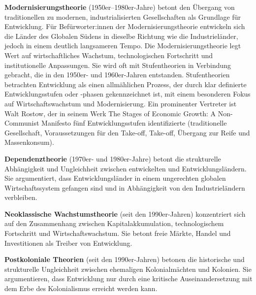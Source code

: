 \documentclass[
  letterpaper,
  DIV=11,
  numbers=noendperiod]{scrartcl}
\begin{document}
\begin{tcolorbox}[enhanced jigsaw, opacitybacktitle=0.6, breakable, left=2mm, colback=white, leftrule=.75mm, colbacktitle=quarto-callout-note-color!10!white, bottomrule=.15mm, toprule=.15mm, titlerule=0mm, title=\textcolor{quarto-callout-note-color}{\faInfo}\hspace{0.5em}{Entwicklungstheorien}, colframe=quarto-callout-note-color-frame, bottomtitle=1mm, opacityback=0, arc=.35mm, toptitle=1mm, rightrule=.15mm, coltitle=black]

\textbf{Modernisierungstheorie} (1950er--1980er-Jahre) betont den
Übergang von traditionellen zu modernen, industrialisierten
Gesellschaften als Grundlage für Entwicklung. Für Befürworter:innen der
Modernisierungstheorie entwickeln sich die Länder des Globalen Südens in
dieselbe Richtung wie die Industrieländer, jedoch in einem deutlich
langsameren Tempo. Die Modernisierungstheorie legt Wert auf
wirtschaftliches Wachstum, technologischen Fortschritt und
institutionelle Anpassungen. Sie wird oft mit Stufentheorien in
Verbindung gebracht, die in den 1950er- und 1960er-Jahren entstanden.
Stufentheorien betrachten Entwicklung als einen allmählichen Prozess,
der durch klar definierte Entwicklungsstufen oder -phasen gekennzeichnet
ist, mit einem besonderen Fokus auf Wirtschaftswachstum und
Modernisierung. Ein prominenter Vertreter ist Walt Rostow, der in seinem
Werk The Stages of Economic Growth: A Non-Communist Manifesto fünf
Entwicklungsstufen identifizierte (traditionelle Gesellschaft,
Voraussetzungen für den Take-off, Take-off, Übergang zur Reife und
Massenkonsum).

\textbf{Dependenztheorie} (1970er- und 1980er-Jahre) betont die
strukturelle Abhängigkeit und Ungleichheit zwischen entwickelten und
Entwicklungsländern. Sie argumentiert, dass Entwicklungsländer in einem
ungerechten globalen Wirtschaftssystem gefangen sind und in Abhängigkeit
von den Industrieländern verbleiben.

\textbf{Neoklassische Wachstumstheorie} (seit den 1990er-Jahren)
konzentriert sich auf den Zusammenhang zwischen Kapitalakkumulation,
technologischem Fortschritt und Wirtschaftswachstum. Sie betont freie
Märkte, Handel und Investitionen als Treiber von Entwicklung.

\textbf{Postkoloniale Theorien} (seit den 1990er-Jahren) betonen die
historische und strukturelle Ungleichheit zwischen ehemaligen
Kolonialmächten und Kolonien. Sie argumentieren, dass Entwicklung nur
durch eine kritische Auseinandersetzung mit dem Erbe des Kolonialismus
erreicht werden kann.


\end{tcolorbox}
\end{document}
